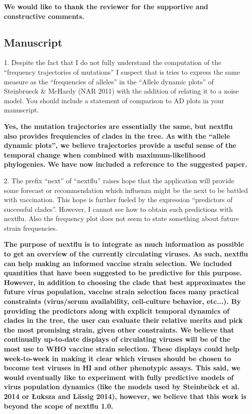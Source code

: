 \documentclass[11pt,oneside,letterpaper]{article}
\begin{document}
{\bf We would like to thank the reviewer for the supportive and constructive comments.}

\subsection*{Manuscript}

1. Despite the fact that I do not fully understand the computation of the ``frequency trajectories of mutations'' I suspect that is tries to express the same measure as the ``frequencies of alleles'' in the ``Allele dynamic plots'' of Steinbrueck \& McHardy (NAR 2011) with the addition of relating it to a noise model. You should include a statement of comparison to AD  plots in your manuscript.

{\bf Yes, the mutation trajectories are essentially the same, but nextflu also provides frequiencies of clades in the tree. As with the ``allele dynamic plots'', we believe trajectories provide a useful sense of the temporal change when combined with maximum-likelihood phylogenies. We have now included a reference to the suggested paper.}

2. The prefix ``next'' of ``nextflu'' raises hope that the application will provide some forecast or recommendation which influenza might be the next to be battled with vaccination. This hope is further fueled by the expression ``predictors of successful clades''. However, I cannot see how to obtain such predictions with nextflu. Also the frequency plot does not seem to state something about future strain frequencies.

{\bf The purpose of nextflu is to integrate as much information as possible to get an overview of the currently circulating viruses. As such, nextflu can help making an informed vaccine strain selection. We included quantities that have been suggested to be predictive for this purpose. However, in addition to choosing the clade that best approximates the future virus population, vaccine strain selection faces many practical constraints (virus/serum availability, cell-culture behavior, etc...). By providing the predictors along with explicit temporal dynamics of clades in the tree, the user can evaluate their relative merits and pick the most promising strain, given other constraints. We believe that continually up-to-date displays of circulating viruses will be of the most use to WHO vaccine strain selection. These displays could help week-to-week in making it clear which viruses should be chosen to become test viruses in HI and other phenotypic assays. This said, we would eventually like to experiment with fully predictive models of virus population dynamics (like the models used by Steinbr\"{u}ck et al. 2014 or \L{}uksza and L\"{a}ssig 2014), however, we believe that this work is beyond the scope of nextflu 1.0.}
\end{document}

